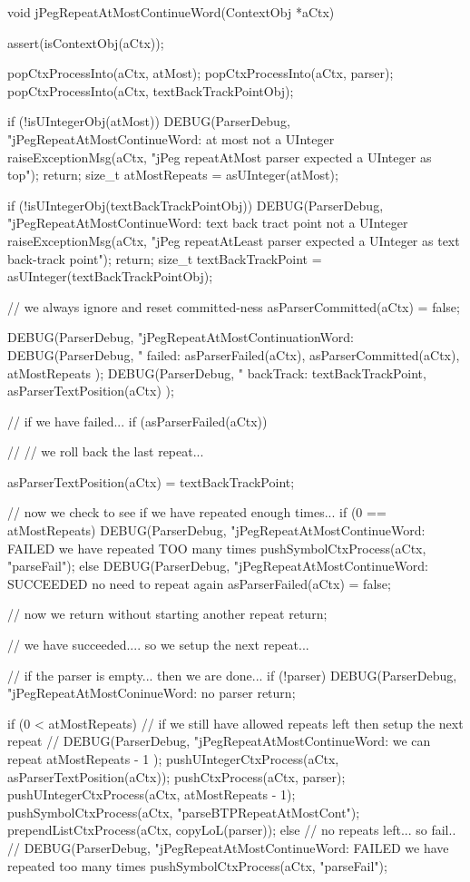 \startCCode
void jPegRepeatAtMostContinueWord(ContextObj *aCtx) {
  assert(isContextObj(aCtx));

  popCtxProcessInto(aCtx, atMost);
  popCtxProcessInto(aCtx, parser);
  popCtxProcessInto(aCtx, textBackTrackPointObj);

  if (!isUIntegerObj(atMost)) {
    DEBUG(ParserDebug,
      "jPegRepeatAtMostContinueWord: at most not a UInteger%
    raiseExceptionMsg(aCtx,
      "jPeg repeatAtMost parser expected a UInteger as top");
    return;
  }
  size_t atMostRepeats = asUInteger(atMost);

  if (!isUIntegerObj(textBackTrackPointObj)) {
    DEBUG(ParserDebug,
      "jPegRepeatAtMostContinueWord: text back tract point not a UInteger%
    raiseExceptionMsg(aCtx,
      "jPeg repeatAtLeast parser expected a UInteger as text back-track point");
    return;
  }
  size_t textBackTrackPoint = asUInteger(textBackTrackPointObj);

  // we always ignore and reset committed-ness
  asParserCommitted(aCtx) = false;

  DEBUG(ParserDebug,
    "jPegRepeatAtMostContinuationWord:%
  DEBUG(ParserDebug,
    "  failed: %
    asParserFailed(aCtx), asParserCommitted(aCtx),
    atMostRepeats
  );
  DEBUG(ParserDebug,
    "  backTrack: %
    textBackTrackPoint, asParserTextPosition(aCtx)
  );
  
  // if we have failed...
  if (asParserFailed(aCtx)) {
    //
    // we roll back the last repeat...

    asParserTextPosition(aCtx) = textBackTrackPoint;
       
    // now we check to see if we have repeated enough times...
    if (0 == atMostRepeats) {
      DEBUG(ParserDebug,
        "jPegRepeatAtMostContinueWord: FAILED we have repeated TOO many times%
      pushSymbolCtxProcess(aCtx, "parseFail");
    } else {
      DEBUG(ParserDebug,
        "jPegRepeatAtMostContinueWord: SUCCEEDED no need to repeat again%
     asParserFailed(aCtx) = false;
    }
    
    // now we return without starting another repeat
    return;
  }
  
  // we have succeeded.... so we setup the next repeat...
  
  // if the parser is empty... then we are done...
  if (!parser) { 
    DEBUG(ParserDebug, "jPegRepeatAtMostConinueWord: no parser%
    return;
  }

  if (0 < atMostRepeats) {
    // if we still have allowed repeats left then setup the next repeat
    //
    DEBUG(ParserDebug,
      "jPegRepeatAtMostContinueWord: we can repeat %
      atMostRepeats - 1 
    );
    pushUIntegerCtxProcess(aCtx, asParserTextPosition(aCtx));
    pushCtxProcess(aCtx, parser);
    pushUIntegerCtxProcess(aCtx, atMostRepeats - 1);
    pushSymbolCtxProcess(aCtx, "parseBTPRepeatAtMostCont");
    prependListCtxProcess(aCtx, copyLoL(parser));
  } else {
    // no repeats left... so fail..
    //
    DEBUG(ParserDebug,
      "jPegRepeatAtMostContinueWord: FAILED we have repeated too many times%
    pushSymbolCtxProcess(aCtx, "parseFail");
  }
}
\stopCCode

